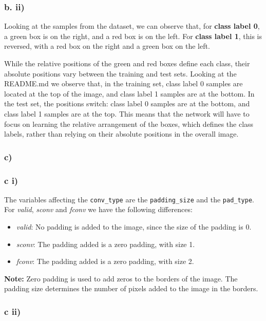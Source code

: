\documentclass{article}
\begin{document}
\subsubsection*{b. ii)}
Looking at the samples from the dataset, we can observe that, for \textbf{class label 0}, a green box is on the right, and a red
box is on the left. For \textbf{class label 1}, this is reversed, with a red box on the right and a green box on the left.

While the relative positions of the green and red boxes define each class,
their absolute positions vary between the training and test sets. Looking at the README.md we observe that, in the training set,
class label 0 samples are located at the top of the image, and class label 1 samples are at the bottom. In the test set,
the positions switch: class label 0 samples are at the bottom, and class label 1 samples are at the top.
This means that the network will have to focus on learning the relative arrangement of the boxes,
which defines the class labels, rather than relying on their absolute positions in the overall image.

\subsubsection*{c)}

\subsubsection*{c i)}


The variables affecting the \texttt{conv\_type} are the \texttt{padding\_size} and the \texttt{pad\_type}.
For \textit{valid}, \textit{sconv} and \textit{fconv} we have the following differences:

\begin{itemize}
    \item \textit{valid}: No padding is added to the image, since the size of the padding is 0.
    \item \textit{sconv}: The padding added is a zero padding, with size 1.
    \item \textit{fconv}: The padding added is a zero padding, with size 2.
\end{itemize}

\textbf{Note:} Zero padding is used to add zeros to the borders of the image. The padding size determines the number of pixels added to the image in the borders.

\subsubsection*{c ii)}
\end{document}
